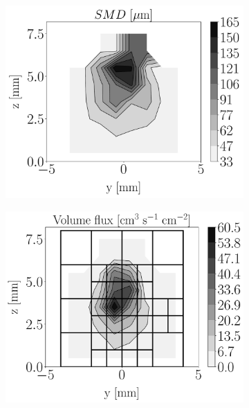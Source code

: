 \begin{figure}[h!]
\vspace*{-0.20in}

\flushleft
\begin{subfigure}[b]{0.2\textwidth}
	\flushleft
	\hspace*{-0.45in}
   \includegraphics[scale=0.19]{./part2_developments/figures_ch6_lagrangian_JICF/injectors_SLI/uG100_dx10_x05_quadtrees_SMD_map}
\end{subfigure}
\hspace*{0.075in}
\begin{subfigure}[b]{0.2\textwidth}
	\flushleft
   \includegraphics[scale=0.19]{./part2_developments/figures_ch6_lagrangian_JICF/injectors_SLI/uG100_dx10_x05_quadtrees_volume_flux_map}

\end{subfigure}
\end{figure}
